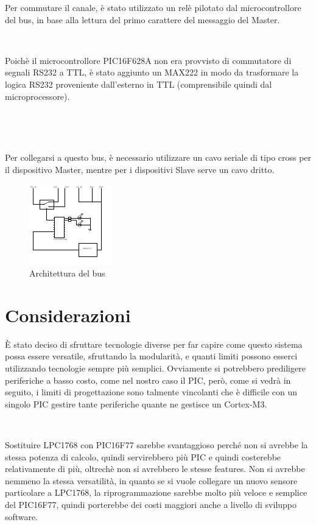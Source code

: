 \documentclass[a4paper,titlepage]{book}
\begin{document}
Per commutare il canale, è stato utilizzato un relè pilotato dal microcontrollore del bus, in base alla lettura del primo carattere del messaggio del Master.

~

Poichè il microcontrollore PIC16F628A non era provvisto di commutatore di segnali RS232 a TTL, è stato aggiunto un MAX222 in modo da trasformare la logica RS232 proveniente dall'esterno in TTL (comprensibile quindi dal microprocessore).

~

~

Per collegarsi a questo bus, è necessario utilizzare un cavo seriale di tipo cross per il dispositivo Master, mentre per i dispositivi Slave serve un cavo dritto.


\begin{figure}[!h]
\centering
\includegraphics[scale=4.5]{bus.pdf}
\caption{Architettura del bus}
\end{figure}

\newpage
\section{Considerazioni}

È stato deciso di sfruttare tecnologie diverse per far capire come questo sistema possa essere versatile, sfruttando la modularità, e quanti limiti possono esserci utilizzando tecnologie sempre più semplici. Ovviamente si potrebbero prediligere periferiche a basso costo, come nel nostro caso il PIC, però, come si vedrà in seguito, i limiti di progettazione sono talmente vincolanti che è difficile con un singolo PIC gestire tante periferiche quante ne gestisce un Cortex-M3.

~

Sostituire LPC1768 con PIC16F77 sarebbe svantaggioso perché non si avrebbe la stessa potenza di calcolo, quindi servirebbero più PIC e quindi costerebbe relativamente di più, oltrechè non si avrebbero le stesse features. Non si avrebbe nemmeno la stessa versatilità, in quanto se si vuole collegare un nuovo sensore particolare a LPC1768, la riprogrammazione sarebbe molto più veloce e semplice del PIC16F77, quindi porterebbe dei costi maggiori anche a livello di sviluppo software.
\end{document}
